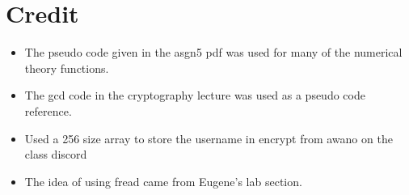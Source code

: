 \documentclass[11pt]{article}
\begin{document}
\section{Credit}
\begin{itemize}
    \item The pseudo code given in the asgn5 pdf was used for many of the numerical theory functions.
    \item The gcd code in the cryptography lecture was used as a pseudo code reference.
    \item Used a 256 size array to store the username in encrypt from awano on the class discord
    \item The idea of using fread came from Eugene's lab section.
\end{itemize}
\end{document}
